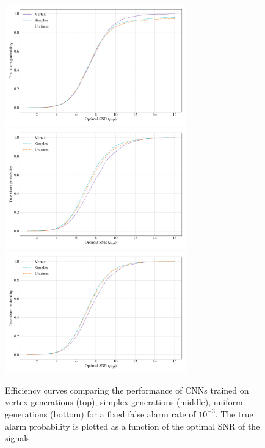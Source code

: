 \documentclass[12pt]{iopart}
\begin{document}
\begin{figure}
    \centering
    \includegraphics[width=0.7\textwidth]{figures/conditional_trained.png}
    \includegraphics[width=0.7\textwidth]{figures/simplex_trained.png}
    \includegraphics[width=0.7\textwidth]{figures/uniform_trained.png}
    \caption{Efficiency curves comparing the performance of \acp{CNN} trained on
vertex generations (top), simplex generations (middle), uniform
generations (bottom) for a fixed false alarm rate of $10^{-3}$. The true alarm probability is plotted as a function of the optimal SNR of the signals.}
\label{fig:eff_curves} 
\end{figure}
\end{document}
